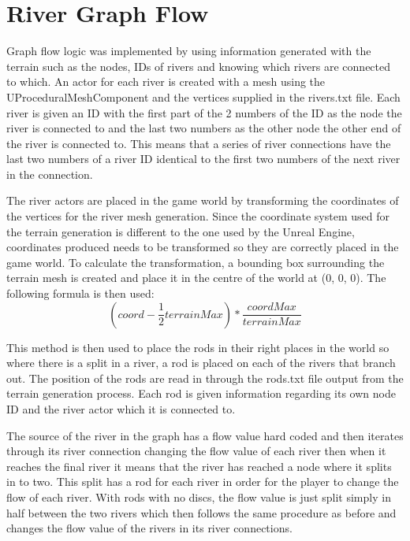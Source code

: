 \section{River Graph Flow}
Graph flow logic was implemented by using information generated with the terrain such as the nodes, IDs of rivers and knowing which rivers are connected to which. An actor for each river is created with a mesh using the UProceduralMeshComponent and the vertices supplied in the rivers.txt file. Each river is given an ID with the first part of the 2 numbers of the ID as the node the river is connected to and the last two numbers as the other node the other end of the river is connected to. This means that a series of river connections have the last two numbers of a river ID identical to the first two numbers of the next river in the connection.
\newline
\par
The river actors are placed in the game world by transforming the coordinates of the vertices for the river mesh generation. Since the coordinate system used for the terrain generation is different to the one used by the Unreal Engine, coordinates produced needs to be transformed so they are correctly placed in the game world. To calculate the transformation, a bounding box surrounding the terrain mesh is created and place it in the centre of the world at (0, 0, 0). The following formula is then used:
\[(coord - \frac{1}{2}terrainMax) * \frac{coordMax}{terrainMax}\]
\newline
\par
This method is then used to place the rods in their right places in the world so where there is a split in a river, a rod is placed on each of the rivers that branch out. The position of the rods are read in through the rods.txt file output from the terrain generation process. Each rod is given information regarding its own node ID and the river actor which it is connected to.
\newline
\par
The source of the river in the graph has a flow value hard coded and then iterates through its river connection changing the flow value of each river then when it reaches the final river it means that the river has reached a node where it splits in to two. This split has a rod for each river in order for the player to change the flow of each river. With rods with no discs, the flow value is just split simply in half between the two rivers which then follows the same procedure as before and changes the flow value of the rivers in its river connections.
